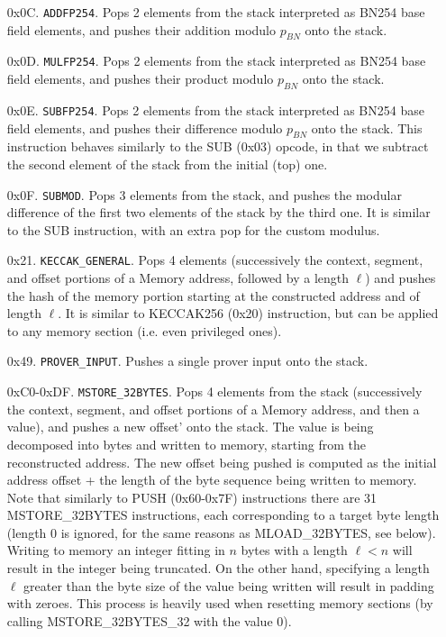 \begin{enumerate}[align=left]
  \item[0x0C.] \texttt{ADDFP254}. Pops 2 elements from the stack interpreted as BN254 base field elements, and pushes their addition modulo $p_{BN}$ onto the stack.

  \item[0x0D.] \texttt{MULFP254}. Pops 2 elements from the stack interpreted as BN254 base field elements, and pushes their product modulo $p_{BN}$ onto the stack.

  \item[0x0E.] \texttt{SUBFP254}. Pops 2 elements from the stack interpreted as BN254 base field elements, and pushes their difference modulo $p_{BN}$ onto the stack.
  This instruction behaves similarly to the SUB (0x03) opcode, in that we subtract the second element of the stack from the initial (top) one.

  \item[0x0F.] \texttt{SUBMOD}. Pops 3 elements from the stack, and pushes the modular difference of the first two elements of the stack by the third one.
  It is similar to the SUB instruction, with an extra pop for the custom modulus.

  \item[0x21.] \texttt{KECCAK\_GENERAL}. Pops 4 elements (successively the context, segment, and offset portions of a Memory address, followed by a length $\ell$)
  and pushes the hash of the memory portion starting at the constructed address and of length $\ell$. It is similar to KECCAK256 (0x20) instruction, but can be applied to
  any memory section (i.e. even privileged ones).

  \item[0x49.] \texttt{PROVER\_INPUT}. Pushes a single prover input onto the stack.

  \item[0xC0-0xDF.] \texttt{MSTORE\_32BYTES}. Pops 4 elements from the stack (successively the context, segment, and offset portions of a Memory address, and then a value), and pushes
  a new offset' onto the stack. The value is being decomposed into bytes and written to memory, starting from the reconstructed address. The new offset being pushed is computed as the
  initial address offset + the length of the byte sequence being written to memory. Note that similarly to PUSH (0x60-0x7F) instructions there are 31 MSTORE\_32BYTES instructions, each
  corresponding to a target byte length (length 0 is ignored, for the same reasons as MLOAD\_32BYTES, see below). Writing to memory an integer fitting in $n$ bytes with a length $\ell < n$ will
  result in the integer being truncated. On the other hand, specifying a length $\ell$ greater than the byte size of the value being written will result in padding with zeroes. This
  process is heavily used when resetting memory sections (by calling MSTORE\_32BYTES\_32 with the value 0).


\end{enumerate}
